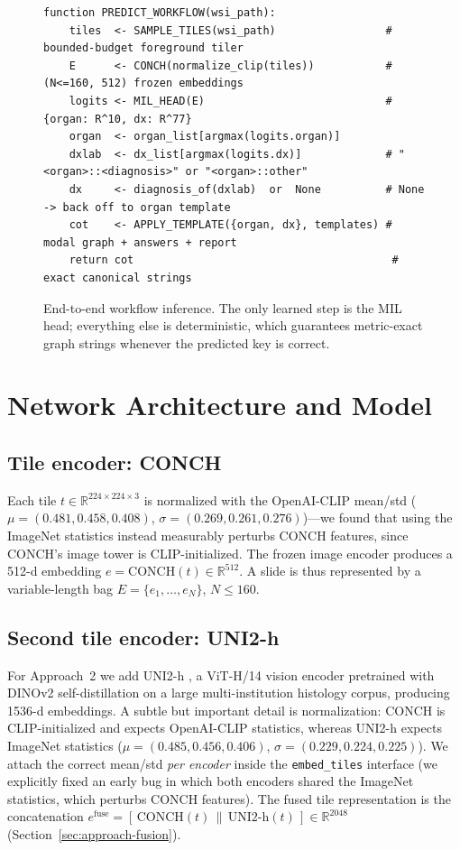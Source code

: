\documentclass[11pt,a4paper]{article}
\newcommand{\code}[1]{\texttt{\small #1}}
\begin{document}
\begin{figure}[h]
\begin{footnotesize}
\begin{verbatim}
function PREDICT_WORKFLOW(wsi_path):
    tiles  <- SAMPLE_TILES(wsi_path)                 # bounded-budget foreground tiler
    E      <- CONCH(normalize_clip(tiles))           # (N<=160, 512) frozen embeddings
    logits <- MIL_HEAD(E)                            # {organ: R^10, dx: R^77}
    organ  <- organ_list[argmax(logits.organ)]
    dxlab  <- dx_list[argmax(logits.dx)]             # "<organ>::<diagnosis>" or "<organ>::other"
    dx     <- diagnosis_of(dxlab)  or  None          # None -> back off to organ template
    cot    <- APPLY_TEMPLATE({organ, dx}, templates) # modal graph + answers + report
    return cot                                        # exact canonical strings
\end{verbatim}
\end{footnotesize}
\caption{End-to-end workflow inference. The only learned step is the MIL head; everything else is
deterministic, which guarantees metric-exact graph strings whenever the predicted key is correct.}
\label{lst:infer}
\end{figure}

\section{Network Architecture and Model}
\label{sec:arch}

\subsection{Tile encoder: CONCH}
Each tile $t \in \mathbb{R}^{224\times224\times3}$ is normalized with the OpenAI-CLIP mean/std
($\mu=(0.481,0.458,0.408)$, $\sigma=(0.269,0.261,0.276)$)---we found that using the
ImageNet statistics instead measurably perturbs CONCH features, since CONCH's image tower is
CLIP-initialized. The frozen image encoder produces a 512-d embedding
$e = \text{CONCH}(t) \in \mathbb{R}^{512}$. A slide is thus represented by a variable-length bag
$E = \{e_1,\dots,e_N\}$, $N \le 160$.

\subsection{Second tile encoder: UNI2-h}
For Approach~2 we add UNI2-h \cite{chen2024uni}, a ViT-H/14 vision encoder pretrained with
DINOv2 self-distillation on a large multi-institution histology corpus, producing 1536-d
embeddings. A subtle but important detail is normalization: CONCH is CLIP-initialized and expects
OpenAI-CLIP statistics, whereas UNI2-h expects ImageNet statistics ($\mu=(0.485,0.456,0.406)$,
$\sigma=(0.229,0.224,0.225)$). We attach the correct mean/std \emph{per encoder} inside the
\code{embed\_tiles} interface (we explicitly fixed an early bug in which both encoders shared the
ImageNet statistics, which perturbs CONCH features). The fused tile representation is the
concatenation $e^{\text{fuse}}=[\,\text{CONCH}(t)\,\|\,\text{UNI2-h}(t)\,]\in\mathbb{R}^{2048}$
(Section~\ref{sec:approach-fusion}).
\end{document}

